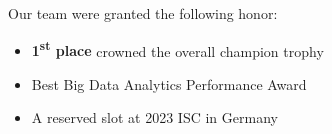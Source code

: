 \documentclass[12pt, a4paper]{article}
\begin{document}
Our team were granted the following honor:

\begin{itemize}
\item \textbf{1\textsuperscript{st} place} crowned the overall champion trophy
\item Best Big Data Analytics Performance Award
\item A reserved slot at 2023 ISC in Germany
\end{itemize}

%
%
%
%
%
%
\end{document}
